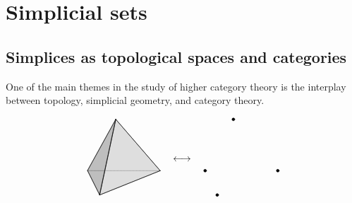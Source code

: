 \documentclass[main.tex]{subfiles}
\begin{document}
\chapter{Simplicial sets}
\label{ch:simplicial_sets}

\section{Simplices as topological spaces and categories}
\label{sec:simplices_as_topological_spaces_and_categories}

One of the main themes in the study of higher category theory is the interplay between topology, simplicial geometry, and category theory.

\begin{equation*}
  \begin{aligned}
    \begin{tikzpicture}[line join = round, scale=1.5, line cap = round]
      \coordinate (3) at (0,{sqrt(2)},0);
      \coordinate (2) at ({-.5*sqrt(3)},0,-.5);
      \coordinate (1) at (0,0,1);
      \coordinate (0) at ({.5*sqrt(3)},0,-.5);

      \draw[densely dotted,] (0)--(2);
      \draw[fill=lightgray,fill opacity=.5] (1)--(0)--(3)--cycle;
      \draw[fill=gray,fill opacity=.5] (2)--(1)--(3)--cycle;
      \draw (1)--(0);
      \draw (1)--(2);
      \draw (2)--(3);
      \draw (1)--(3);
      \draw (0)--(3);
    \end{tikzpicture}
  \end{aligned}
  \quad \longleftrightarrow \quad
  \begin{aligned}
    \begin{tikzpicture}[dot/.style={draw,circle,minimum size=1mm,inner sep=0pt,outer sep=0pt,fill=black}, line join = round, scale=1.5, line cap = round]

      \coordinate[draw, dot] (3) at (0,{sqrt(2)},0);
      \coordinate[draw, dot] (2) at ({.5*sqrt(3)},0,-.5);
      \coordinate[draw, dot] (1) at (0,0,1);
      \coordinate[draw, dot] (0) at ({-.5*sqrt(3)},0,-.5);


\end{tikzpicture}
\end{aligned}
\end{equation*}
\end{document}

